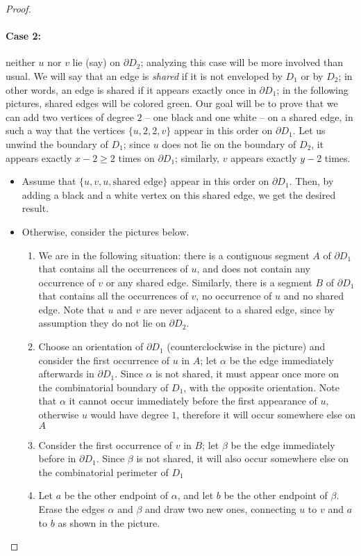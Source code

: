 \begin{proof}
\paragraph{Case 2:} neither $u$ nor $v$ lie (say) on $\partial D_2$; analyzing this case will be more involved than usual. We will say that an edge is \emph{shared} if it is not enveloped by $D_1$ or by $D_2$; in other words, an edge is shared if it appears exactly once in $\partial D_1$; in the following pictures, shared edges will be colored green. Our goal will be to prove that we can add two vertices of degree $2$ -- one black and one white -- on a shared edge, in such a way that the vertices $\{u,2,2,v\}$ appear in this order on $\partial D_1$. Let us unwind the boundary of $D_1$; since $u$ does not lie on the boundary of $D_2$, it appears exactly $x-2\ge 2$ times on $\partial D_1$; similarly, $v$ appears exactly $y-2$ times.
\begin{itemize}
\item Assume that $\{u,v,u,\text{shared edge}\}$ appear in this order on $\partial D_1$. Then, by adding a black and a white vertex on this shared edge, we get the desired result.
\item Otherwise, consider the pictures below.
\begin{enumerate}[(1)]
\item We are in the following situation: there is a contiguous segment $A$ of $\partial D_1$ that contains all the occurrences of $u$, and does not contain any occurrence of $v$ or any shared edge. Similarly, there is a segment $B$ of $\partial D_1$ that contains all the occurrences of $v$, no occurrence of $u$ and no shared edge. Note that $u$ and $v$ are never adjacent to a shared edge, since by assumption they do not lie on $\partial D_2$.
\item Choose an orientation of $\partial D_1$ (counterclockwise in the picture) and consider the first occurrence of $u$ in $A$; let $\alpha$ be the edge immediately afterwards in $\partial D_1$. Since $\alpha$ is not shared, it must appear once more on the combinatorial boundary of $D_1$, with the opposite orientation. Note that $\alpha$ it cannot occur immediately before the first appearance of $u$, otherwise $u$ would have degree $1$, therefore it will occur somewhere else on $A$
\item Consider the first occurrence of $v$ in $B$; let $\beta$ be the edge immediately before in $\partial D_1$. Since $\beta$ is not shared, it will also occur somewhere else on the combinatorial perimeter of $D_1$
\item Let $a$ be the other endpoint of $\alpha$, and let $b$ be the other endpoint of $\beta$. Erase the edges $\alpha$ and $\beta$ and draw two new ones, connecting $u$ to $v$ and $a$ to $b$ as shown in the picture.

\end{enumerate}
\end{itemize}
\end{proof}
